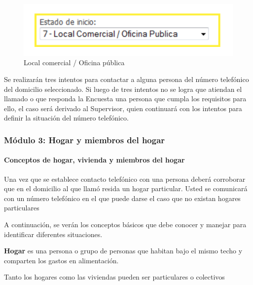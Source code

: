 \documentclass[
  openany]{book}
\begin{document}
\begin{figure}

{\centering \includegraphics[width=1\linewidth]{imagenes/figura6-45} 

}

\caption{Local comercial / Oficina pública}\label{fig:Localcomer5}
\end{figure}

Se realizarán tres intentos para contactar a alguna persona del número telefónico del domicilio seleccionado. Si luego de tres intentos no se logra que atiendan el llamado o que responda la Encuesta una persona que cumpla los requisitos para ello, el caso será derivado al Supervisor, quien continuará con los intentos para definir la situación del número telefónico.

\hypertarget{muxf3dulo-3-hogar-y-miembros-del-hogar}{%
\subsubsection{Módulo 3: Hogar y miembros del hogar}\label{muxf3dulo-3-hogar-y-miembros-del-hogar}}

\hypertarget{conceptos-de-hogar-vivienda-y-miembros-del-hogar}{%
\paragraph{Conceptos de hogar, vivienda y miembros del hogar}\label{conceptos-de-hogar-vivienda-y-miembros-del-hogar}}

Una vez que se establece contacto telefónico con una persona deberá corroborar que en el domicilio al que llamó resida un hogar particular. Usted se comunicará con un número telefónico en el que puede darse el caso que no existan hogares particulares

A continuación, se verán los conceptos básicos que debe conocer y manejar para identificar diferentes situaciones.

\textbf{Hogar} es una persona o grupo de personas que habitan bajo el mismo techo y comparten los gastos en alimentación.

Tanto los hogares como las viviendas pueden ser particulares o colectivos
\end{document}
